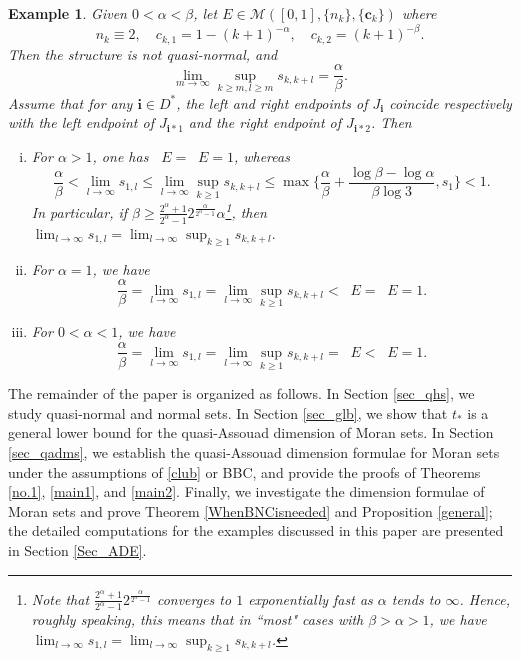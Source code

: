\documentclass[12pt]{amsart}
\numberwithin{equation}{section}
\theoremstyle{plain}
\newtheorem{example}{Example}[section]
\theoremstyle{remark}
\newtheorem{remark}[theorem]{Remark}
\theoremstyle{definition}
\newcommand{\om}{\overline{M}}
\newcommand{\iii}{\mathbf{i}}
\newcommand{\ccc}{\mathbf{c}}
\newcommand{\f}{\frac}
\renewcommand{\ge}{\geqslant}
\renewcommand{\le}{\leqslant}
\DeclareMathOperator{\dima}{dim_A}
\DeclareMathOperator{\dimqa}{dim_{qA}}
\newcommand{\blue}[1]{{\color{blue}#1}}
\begin{document}
	\begin{example}\label{exa}
		Given $0<\alpha<\beta$, let $E\in \mathcal{M}([0,1],\{n_k\},\{\ccc_{k}\})$ where
		\[
		n_k\equiv 2,\quad c_{k,1}=1- (k+1)^{-\alpha},\quad c_{k,2}=(k+1)^{-\beta}.
		\] 
		Then the structure is not quasi-normal, and
		\[
		\lim_{m\to\infty}\sup_{k\ge m,l\ge m}s_{k,k+l}=\f\alpha\beta.
		\]
Assume that for any $\iii\in D^*$, the left and right endpoints of 
		$J_\iii$ coincide  respectively  with the left endpoint of
		$J_{\iii*1}$ and the right endpoint of $J_{\iii*2}$. Then
		\begin{enumerate}[(i)]
			\item For $\alpha>1$, one has $\dimqa E=\dima E=1$, whereas
			\[
			\f\alpha\beta<\lim_{l\to\infty} s_{1,l}\le\lim_{l\to\infty}\sup_{k\ge 1} s_{k,k+l}\le\max \Big\{\f\alpha\beta+\f{\log\beta-\log\alpha}{\beta\log 3},s_{1}\Big\}<1.
			\]
			In particular, if $\beta\ge\f{2^\alpha+1}{2^\alpha-1}2^{\f{\alpha}{2^\alpha-1}}\alpha$\footnote[2]{Note that $\f{2^\alpha+1}{2^\alpha-1}2^{\f{\alpha}{2^\alpha-1}}$ converges to $1$ exponentially fast as $\alpha$ tends to $\infty$. Hence, roughly speaking, this means that in ``most" cases with $\beta>\alpha>1$, we have $\lim_{l\to\infty} s_{1,l}=\lim_{l\to\infty}\sup_{k\ge 1} s_{k,k+l}$.}, then $\lim_{l\to\infty} s_{1,l}=\lim_{l\to\infty}\sup_{k\ge1} s_{k,k+l}.$ 
			\item For $\alpha= 1$, we have 
			\[
			\f\alpha\beta=\lim_{l\to\infty} s_{1,l}=\lim_{l\to\infty}\sup_{k\ge1} s_{k,k+l}<\dimqa E=\dima E=1.
			\]
			
			\item For $0<\alpha< 1$, we have 
			\[
			\f\alpha\beta=\lim_{l\to\infty} s_{1,l}=\lim_{l\to\infty}\sup_{k\ge1} s_{k,k+l}=\dimqa E<\dima E=1.
			\]
		\end{enumerate} 
	\end{example} 
	
	

	The remainder of the paper  is organized as follows. In Section \ref{sec_qhs}, we study quasi-normal and normal sets.
	In Section \ref{sec_glb}, we show that $t_*$ is  a general lower bound for the quasi-Assouad dimension of Moran sets. In Section \ref{sec_qadms}, we establish the quasi-Assouad dimension formulae for Moran sets under the assumptions of \eqref{club} or BBC, and provide the proofs of Theorems \ref{no.1}, \ref{main1}, and \ref{main2}. Finally, we investigate the dimension formulae of Moran sets and prove Theorem \ref{WhenBNCisneeded} and Proposition \ref{general}; the detailed computations for the examples discussed in this paper are presented in Section \ref{Sec_ADE}.
	
\end{document}
